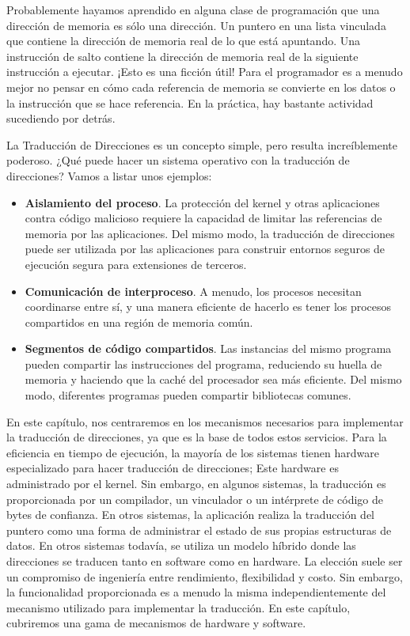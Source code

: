 \documentclass[10pt]{book}
\begin{document}
Probablemente hayamos aprendido en alguna clase de programación que una dirección de memoria es sólo una dirección. Un puntero en una lista vinculada que contiene la dirección de memoria real de lo que está apuntando. Una instrucción de salto contiene la dirección de memoria real de la siguiente instrucción a ejecutar. ¡Esto es una ficción útil! Para el programador es a menudo mejor no pensar en cómo cada referencia de memoria se convierte en los datos o la instrucción que se hace referencia. En la práctica, hay bastante actividad sucediendo por detrás.

La Traducción de Direcciones es un concepto simple, pero resulta increíblemente poderoso. ¿Qué puede hacer un sistema operativo con la traducción de direcciones? Vamos a listar unos ejemplos:
\begin{itemize}
\item \textbf{Aislamiento del proceso}. La protección del kernel y otras aplicaciones contra código malicioso requiere la capacidad de limitar las referencias de memoria por las aplicaciones. Del mismo modo, la traducción de direcciones puede ser utilizada por las aplicaciones para construir entornos seguros de ejecución segura para extensiones de terceros.

\item \textbf{Comunicación de interproceso}. A menudo, los procesos necesitan coordinarse entre sí, y una manera eficiente de hacerlo es tener los procesos compartidos en una región de memoria común.

\item \textbf{Segmentos de código compartidos}. Las instancias del mismo programa pueden compartir las instrucciones del programa, reduciendo su huella de memoria y haciendo que la caché del procesador sea más eficiente. Del mismo modo, diferentes programas pueden compartir bibliotecas comunes.
\end{itemize}

En este capítulo, nos centraremos en los mecanismos necesarios para implementar la traducción de direcciones, ya que es la base de todos estos servicios. Para la eficiencia en tiempo de ejecución, la mayoría de los sistemas tienen hardware especializado para hacer traducción de direcciones; Este hardware es administrado por el kernel. Sin embargo, en algunos sistemas, la traducción es proporcionada por un compilador, un vinculador o un intérprete de código de bytes de confianza. En otros sistemas, la aplicación realiza la traducción del puntero como una forma de administrar el estado de sus propias estructuras de datos. En otros sistemas todavía, se utiliza un modelo híbrido donde las direcciones se traducen tanto en software como en hardware. La elección suele ser un compromiso de ingeniería entre rendimiento, flexibilidad y costo. Sin embargo, la funcionalidad proporcionada es a menudo la misma independientemente del mecanismo utilizado para implementar la traducción. En este capítulo, cubriremos una gama de mecanismos de hardware y software.
\end{document}
